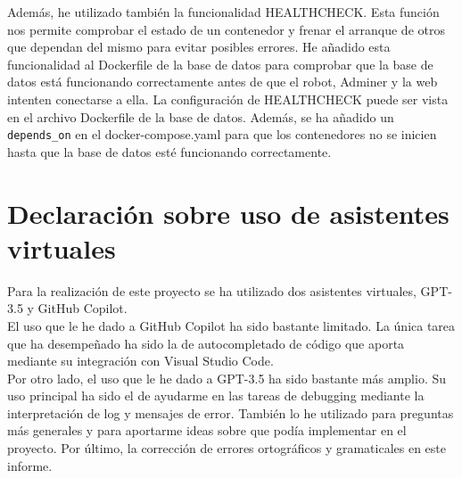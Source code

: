 \documentclass{report}
\begin{document}
            Además, he utilizado también la funcionalidad HEALTHCHECK.
            Esta función nos permite comprobar el estado de un contenedor y frenar el arranque de otros que dependan del mismo para evitar posibles errores.
            He añadido esta funcionalidad al Dockerfile de la base de datos para comprobar que la base de datos está funcionando correctamente antes de que el robot, Adminer y la web intenten conectarse a ella.
            La configuración de HEALTHCHECK puede ser vista en el archivo Dockerfile de la base de datos.
            Además, se ha añadido un \texttt{depends\_on} en el docker-compose.yaml para que los contenedores no se inicien hasta que la base de datos esté funcionando correctamente.\\
        \clearpage
    \chapter{Declaración sobre uso de asistentes virtuales}
        Para la realización de este proyecto se ha utilizado dos asistentes virtuales, GPT-3.5 y GitHub Copilot.\\

        El uso que le he dado a GitHub Copilot ha sido bastante limitado.
        La única tarea que ha desempeñado ha sido la de autocompletado de código que aporta mediante su integración con Visual Studio Code.\\

        Por otro lado, el uso que le he dado a GPT-3.5 ha sido bastante más amplio.
        Su uso principal ha sido el de ayudarme en las tareas de debugging mediante la interpretación de log y mensajes de error.
        También lo he utilizado para preguntas más generales y para aportarme ideas sobre que podía implementar en el proyecto.
        Por último, la corrección de errores ortográficos y gramaticales en este informe.\\
\end{document}
